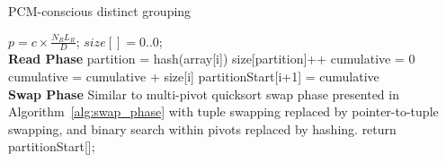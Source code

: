 \begin{algorithm}[h!]
\caption{PCM-conscious distinct grouping}
\label{alg:hash_based_pcm_partition}
\begin{algorithmic}[1]
\State $ p = c\times \frac{N_R L_R}{D}$;
\State $ size[] = {0..0}$;   
\\
\textbf{Read Phase}
\State partition = hash(array[i]) 
\State size[partition]++ 
\EndFor
{}
\State cumulative = 0
\State cumulative = cumulative + size[i]
\State partitionStart[i+1] = cumulative
\EndFor
{}\\
\textbf{Swap Phase}
\State Similar to multi-pivot quicksort swap phase presented in Algorithm~\ref{alg:swap_phase} with tuple swapping replaced by pointer-to-tuple swapping, and binary search within pivots replaced by hashing.
\State return partitionStart[];
\end{algorithmic}
\end{algorithm} 
